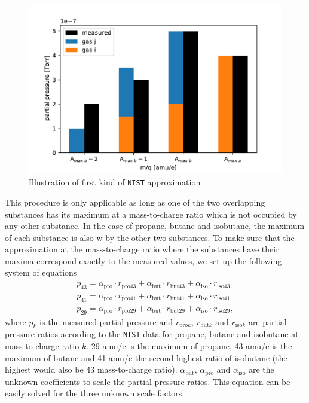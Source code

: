 \begin{figure}[h!]
    \centering
    \includegraphics[width=\textwidth]{Report/DataResultsPlots/ilustration_nist_approx1.pdf}
    \caption{Illustration of first kind of \texttt{NIST} approximation}
    \label{fig:illustration_nist1}
\end{figure}

This procedure is only applicable as long as one of the two overlapping substances has its maximum at a mass-to-charge ratio which is not occupied by any other substance.  In the case of propane, butane and isobutane, the maximum of each substance is also w by the other two substances. To make sure that the approximation at the mass-to-charge ratio where the substances have their maxima correspond exactly to the measured values, we set up the following system of equations  
\begin{align} \label{eq:coef1}
    p_{43} = \alpha_{\mathrm{pro}}\cdot r_\mathrm{pro43} + \alpha_\mathrm{but} \cdot r_\mathrm{but43} + \alpha_\mathrm{iso}\cdot r_\mathrm{iso43} \\
    \label{eq:coef2}
    p_{41} = \alpha_{\mathrm{pro}}\cdot r_\mathrm{pro41} + \alpha_\mathrm{but} \cdot r_\mathrm{but41} + \alpha_\mathrm{iso}\cdot r_\mathrm{iso41} \\
    \label{eq:coef3}
    p_{29} = \alpha_{\mathrm{pro}}\cdot r_\mathrm{pro29} + \alpha_\mathrm{but} \cdot r_\mathrm{but29} + \alpha_\mathrm{iso}\cdot r_\mathrm{iso29},
\end{align}
where $p_k$ is the measured partial pressure and $r_{\mathrm{pro}k}$, $r_{\mathrm{but}k}$ and $r_{\mathrm{iso}k}$ are partial pressure ratios according to the \texttt{NIST} data for propane, butane and isobutane at mass-to-charge ratio $k$. 29 amu/e is the maximum of propane, 43 amu/e is the maximum of butane and 41 amu/e the second highest ratio of isobutane (the highest would also be 43 mass-to-charge ratio). $\alpha_\mathrm{but}$, $\alpha_\mathrm{pro}$ and $\alpha_\mathrm{iso}$ are the unknown coefficients to scale the partial pressure ratios. This equation can be easily solved for the three unknown scale factors. 

